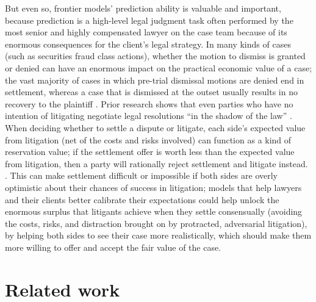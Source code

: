 \documentclass[11pt]{article}
\begin{document}
But even so, frontier models' prediction ability is valuable and important, because prediction is a high-level legal judgment task often performed by the most senior and highly compensated lawyer on the case team because of its enormous consequences for the client's legal strategy. In many kinds of cases (such as securities fraud class actions), whether the motion to dismiss is granted or denied can have an enormous impact on the practical economic value of a case; the vast majority of cases in which pre-trial dismissal motions are denied end in settlement, whereas a case that is dismissed at the outset usually results in no recovery to the plaintiff \citep[p.~16]{securitiesFilings2024}. Prior research shows that even parties who have no intention of litigating negotiate legal resolutions ``in the shadow of the law'' \citep{shadow}. When deciding whether to settle a dispute or litigate, each side's expected value from litigation (net of the costs and risks involved) can function as a kind of reservation value; if the settlement offer is worth less than the expected value from litigation, then a party will rationally reject settlement and litigate instead. \citep{priestklein,settlement}. This can make settlement difficult or impossible if both sides are overly optimistic about their chances of success in litigation; models that help lawyers and their clients better calibrate their expectations could help unlock the enormous surplus that litigants achieve when they settle consensually (avoiding the costs, risks, and distraction brought on by protracted, adversarial litigation), by helping both sides to see their case more realistically, which should make them more willing to offer and accept the fair value of the case.

\section{Related work}
\end{document}
